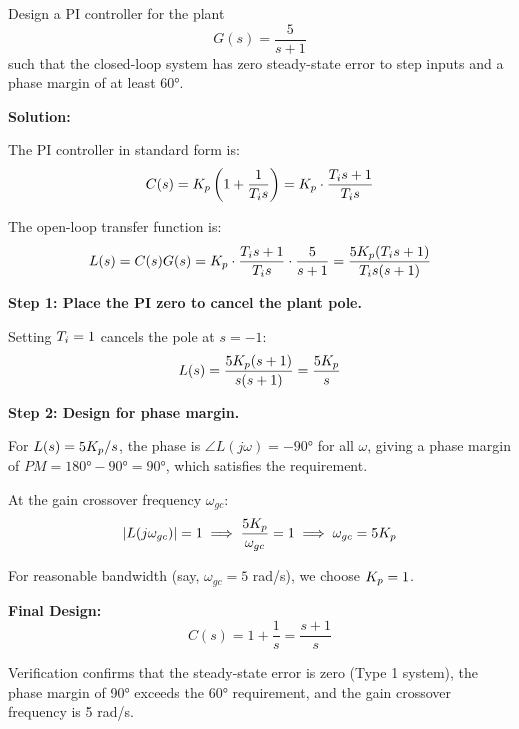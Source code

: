\begin{example}
\label{ex:pi_design}
Design a PI controller for the plant
\begin{equation*}
G(s) = \frac{5}{s + 1}
\end{equation*}
such that the closed-loop system has zero steady-state error to step inputs and a phase margin of at least 60°.

\textbf{Solution:}

The PI controller in standard form is:
\begin{equation*}
C(s) = K_p\left(1 + \frac{1}{T_i s}\right) = K_p \cdot \frac{T_i s + 1}{T_i s}
\end{equation*}

The open-loop transfer function is:
\begin{equation*}
L(s) = C(s)G(s) = K_p \cdot \frac{T_i s + 1}{T_i s} \cdot \frac{5}{s + 1} = \frac{5K_p(T_i s + 1)}{T_i s(s + 1)}
\end{equation*}

\textbf{Step 1: Place the PI zero to cancel the plant pole.}

Setting $T_i = 1$ cancels the pole at $s = -1$:
\begin{equation*}
L(s) = \frac{5K_p(s + 1)}{s(s + 1)} = \frac{5K_p}{s}
\end{equation*}

\textbf{Step 2: Design for phase margin.}

For $L(s) = 5K_p/s$, the phase is $\angle L(j\omega) = -90°$ for all $\omega$, giving a phase margin of $PM = 180° - 90° = 90°$, which satisfies the requirement.

At the gain crossover frequency $\omega_{gc}$:
\begin{equation*}
|L(j\omega_{gc})| = 1 \implies \frac{5K_p}{\omega_{gc}} = 1 \implies \omega_{gc} = 5K_p
\end{equation*}

For reasonable bandwidth (say, $\omega_{gc} = 5$ rad/s), we choose $K_p = 1$.

\textbf{Final Design:}
\begin{equation*}
\boxed{C(s) = 1 + \frac{1}{s} = \frac{s + 1}{s}}
\end{equation*}

Verification confirms that the steady-state error is zero (Type 1 system), the phase margin of 90° exceeds the 60° requirement, and the gain crossover frequency is 5 rad/s.
\end{example}

